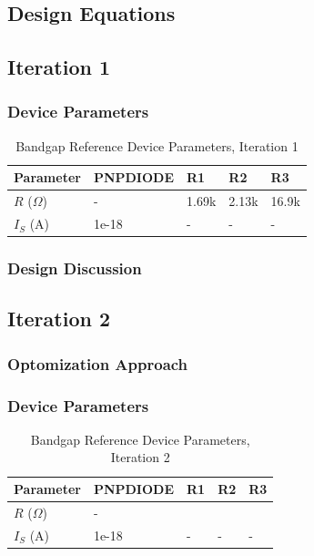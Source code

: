 \documentclass[conference]{IEEEtran}
\begin{document}
\subsection{Design Equations}

\subsection{Iteration 1}
	\subsubsection{Device Parameters}
\begin{table}[!htbp]
  \caption[]{Bandgap Reference Device Parameters, Iteration 1}
  \label{tab:bg-dp-1}
  \centering
  \begin{tabular}{|l|l|l|l|l|}
    \hline
    Parameter			& PNPDIODE	&R1 &R2	&R3 \\ \hline
    $R$ ($\Omega$)		&-			&1.69k	&2.13k	&16.9k\\ \hline
    $I_S$ (A)		&1e-18			&-	&-	&-\\
    \hline
  \end{tabular}
\end{table}
\subsubsection{Design Discussion}

\subsection{Iteration 2}
\subsubsection{Optomization Approach}
	\subsubsection{Device Parameters}
\begin{table}[!htbp]
  \caption[]{Bandgap Reference Device Parameters, Iteration 2}
  \label{tab:bg-dp-2}
  \centering
  \begin{tabular}{|l|l|l|l|l|}
    \hline
    Parameter			& PNPDIODE	&R1 &R2	&R3 \\ \hline
    $R$ ($\Omega$)		&-		&	&	&\\ \hline
    $I_S$ (A)		&1e-18		&-	&-	&-\\
    \hline
  \end{tabular}
\end{table}
\end{document}
